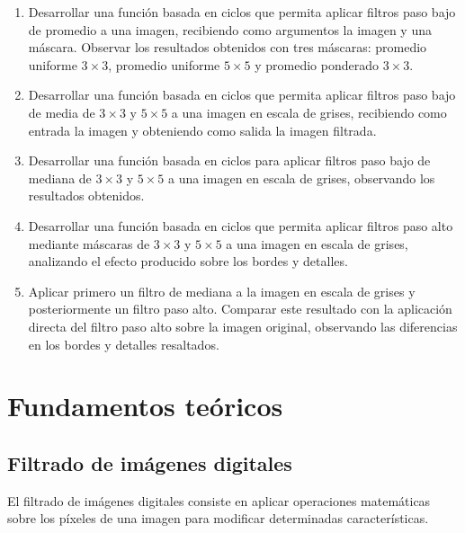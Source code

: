 \documentclass[11pt,letterpaper]{article}
\begin{document}
\begin{enumerate}

    \item Desarrollar una función basada en ciclos que permita
    aplicar filtros paso bajo de promedio a una imagen,
    recibiendo como argumentos la imagen y una máscara.
    Observar los resultados obtenidos con tres máscaras:
    promedio uniforme $3\times3$, promedio uniforme
    $5\times5$ y promedio ponderado $3\times3$.

    \item Desarrollar una función basada en ciclos que permita
    aplicar filtros paso bajo de media de $3\times3$ y
    $5\times5$ a una imagen en escala de grises, recibiendo
    como entrada la imagen y obteniendo como salida
    la imagen filtrada.

    \item Desarrollar una función basada en ciclos para aplicar
    filtros paso bajo de mediana de $3\times3$ y $5\times5$
    a una imagen en escala de grises, observando los
    resultados obtenidos.

    \item Desarrollar una función basada en ciclos que permita
    aplicar filtros paso alto mediante máscaras de
    $3\times3$ y $5\times5$ a una imagen en escala de
    grises, analizando el efecto producido sobre
    los bordes y detalles.

    \item Aplicar primero un filtro de mediana a la imagen
    en escala de grises y posteriormente un filtro paso alto.
    Comparar este resultado con la aplicación directa
    del filtro paso alto sobre la imagen original,
    observando las diferencias en los bordes
    y detalles resaltados.

\end{enumerate}

\section{Fundamentos teóricos}

\subsection{Filtrado de imágenes digitales}

El filtrado de imágenes digitales consiste en aplicar
operaciones matemáticas sobre los píxeles de una imagen
para modificar determinadas características.
\end{document}

